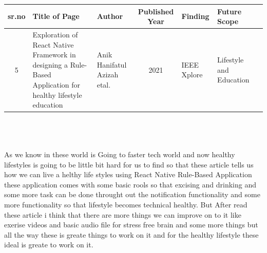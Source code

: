 \documentclass[12pt,a4paper]{article}
\begin{document}
\begin{tabular}{ |c | m{2.5cm} | m{2cm}| c | m{2cm} | m{2cm} | c | }

  \hline
  sr.no & Title of Page & Author & Published Year & Finding & Future Scope  \\ 
  \hline
 5 &  Exploration of React Native Framework in designing a Rule-Based Application for healthy lifestyle education & Anik Hanifatul Azizah etal. &  2021 & IEEE Xplore & Lifestyle and Education \\
\hline 
  
\end{tabular}
\\
\\
\\
As  we know in these world is Going to faster tech world and now healthy lifestyles is going to be little bit hard for us to find so that these article tells us how we can live a helthy life styles using React Native Rule-Based Application these application comes with some basic rools so that excising and drinking and some more task can be done throught out the notification functionality and some more functionality so that lifestyle becomes technical healthy. But After read these article i think that there are more things we can improve on to it like exerise videos and basic audio file for stress free brain and some more things but all the way these is greate things to work on it and for the healthy lifestyle these ideal is greate to work on it.
\end{document}
